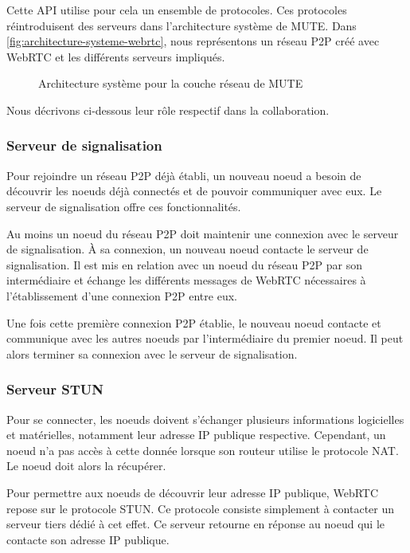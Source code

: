 \documentclass[12pt]{thesul}
\begin{document}
Cette API utilise pour cela un ensemble de protocoles.
Ces protocoles réintroduisent des serveurs dans l'architecture système de MUTE.
Dans \autoref{fig:architecture-systeme-webrtc}, nous représentons un réseau \ac{P2P} créé avec \ac{WebRTC} et les différents serveurs impliqués.

\begin{figure}[!ht]
  \caption{Architecture système pour la couche réseau de MUTE}
  \label{fig:architecture-systeme-webrtc}
\end{figure}

Nous décrivons ci-dessous leur rôle respectif dans la collaboration.

\subsubsection{Serveur de signalisation}

Pour rejoindre un réseau \ac{P2P} déjà établi, un nouveau noeud a besoin de découvrir les noeuds déjà connectés et de pouvoir communiquer avec eux.
Le serveur de signalisation offre ces fonctionnalités.

Au moins un noeud du réseau \ac{P2P} doit maintenir une connexion avec le serveur de signalisation.
À sa connexion, un nouveau noeud contacte le serveur de signalisation.
Il est mis en relation avec un noeud du réseau \ac{P2P} par son intermédiaire et échange les différents messages de \ac{WebRTC} nécessaires à l'établissement d'une connexion \ac{P2P} entre eux.

Une fois cette première connexion \ac{P2P} établie, le nouveau noeud contacte et communique avec les autres noeuds par l'intermédiaire du premier noeud.
Il peut alors terminer sa connexion avec le serveur de signalisation.

\subsubsection{Serveur STUN}

Pour se connecter, les noeuds doivent s'échanger plusieurs informations logicielles et matérielles, notamment leur adresse IP publique respective.
Cependant, un noeud n'a pas accès à cette donnée lorsque son routeur utilise le protocole NAT.
Le noeud doit alors la récupérer.

Pour permettre aux noeuds de découvrir leur adresse IP publique, \ac{WebRTC} repose sur le protocole STUN.
Ce protocole consiste simplement à contacter un serveur tiers dédié à cet effet.
Ce serveur retourne en réponse au noeud qui le contacte son adresse IP publique.
\end{document}
